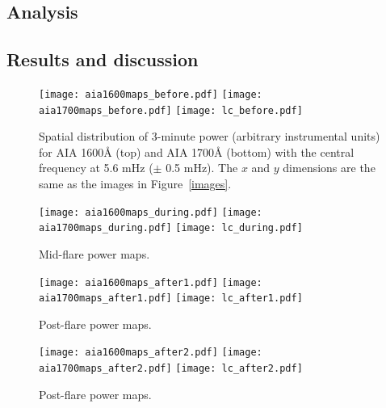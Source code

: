 %
%
%






\subsection{Analysis}


\subsection{Results and discussion}

\begin{figure*}[htb!]\centering
    \texttt{[image: aia1600maps\_before.pdf]}
    \texttt{[image: aia1700maps\_before.pdf]}
    \texttt{[image: lc\_before.pdf]}
    \caption{%
        Spatial distribution of 3-minute power (arbitrary instrumental units)
        for AIA 1600\AA{} (top) and AIA 1700\AA{} (bottom)
        with the central frequency at 5.6 mHz ($\pm$ 0.5 mHz).
        The $x$ and $y$ dimensions are the same as the images in
        Figure~\ref{images}.
    \label{powermaps}}
\end{figure*}

\begin{figure*}[htb!]\centering
    \texttt{[image: aia1600maps\_during.pdf]}
    \texttt{[image: aia1700maps\_during.pdf]}
    \texttt{[image: lc\_during.pdf]}
    \caption{%
        Mid-flare power maps.
    \label{powermaps_during}}
\end{figure*}

\begin{figure*}[htb!]\centering
    \texttt{[image: aia1600maps\_after1.pdf]}
    \texttt{[image: aia1700maps\_after1.pdf]}
    \texttt{[image: lc\_after1.pdf]}
    \caption{%
        Post-flare power maps.
    \label{powermaps_after1}}
\end{figure*}

\begin{figure*}[htb!]\centering
    \texttt{[image: aia1600maps\_after2.pdf]}
    \texttt{[image: aia1700maps\_after2.pdf]}
    \texttt{[image: lc\_after2.pdf]}
    \caption{%
        Post-flare power maps.
    \label{powermaps_after2}}
\end{figure*}

